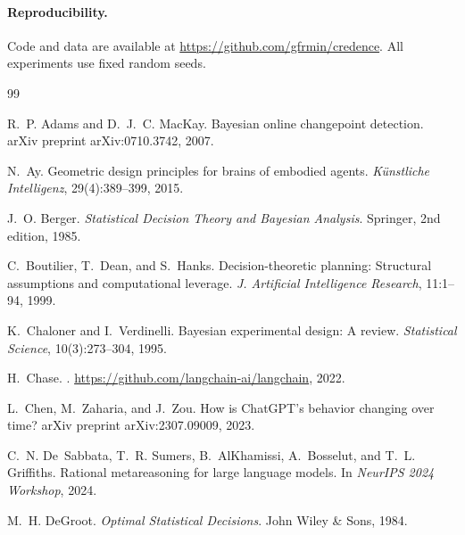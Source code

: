 \documentclass[11pt]{article}
\begin{document}
\paragraph{Reproducibility.} Code and data are available at \url{https://github.com/gfrmin/credence}. All experiments use fixed random seeds.




\begin{thebibliography}{99}

R.~P. Adams and D.~J.~C. MacKay.
\newblock Bayesian online changepoint detection.
\newblock arXiv preprint arXiv:0710.3742, 2007.

N.~Ay.
\newblock Geometric design principles for brains of embodied agents.
\newblock \emph{K{\"u}nstliche Intelligenz}, 29(4):389--399, 2015.

J.~O. Berger.
\newblock \emph{Statistical Decision Theory and Bayesian Analysis}.
\newblock Springer, 2nd edition, 1985.

C.~Boutilier, T.~Dean, and S.~Hanks.
\newblock Decision-theoretic planning: Structural assumptions and computational leverage.
\newblock \emph{J. Artificial Intelligence Research}, 11:1--94, 1999.

K.~Chaloner and I.~Verdinelli.
\newblock Bayesian experimental design: A review.
\newblock \emph{Statistical Science}, 10(3):273--304, 1995.

H.~Chase.
.
\newblock \url{https://github.com/langchain-ai/langchain}, 2022.

L.~Chen, M.~Zaharia, and J.~Zou.
\newblock How is {ChatGPT}'s behavior changing over time?
\newblock arXiv preprint arXiv:2307.09009, 2023.

C.~N. De~Sabbata, T.~R. Sumers, B.~AlKhamissi, A.~Bosselut, and T.~L. Griffiths.
\newblock Rational metareasoning for large language models.
\newblock In \emph{NeurIPS 2024 Workshop}, 2024.

M.~H. DeGroot.
\newblock \emph{Optimal Statistical Decisions}.
\newblock John Wiley \& Sons, 1984.


\end{thebibliography}
\end{document}
